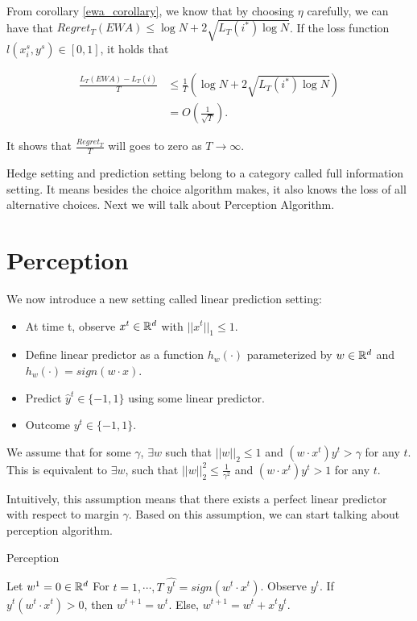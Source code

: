 \documentclass[../main.tex]{subfiles}
\begin{document}
From corollary \ref{ewa_corollary}, we know that by choosing $\eta$ carefully, we can have that $Regret_T(EWA) \leq \log N + 2 \sqrt{L_T(i^*) \log N}$. If the loss function $l(x_i^s, y^s) \in [0,1]$, it holds that

\begin{equation*}
\begin{aligned}
\frac{L_T(EWA) - L_T(i)}{T} & \leq \frac{1}{T} (\log N + 2 \sqrt{L_T(i^*) \log N}) \\
& = O(\frac{1}{\sqrt{T}}).
\end{aligned}
\end{equation*}

It shows that $\frac{Regret_T }{T}$ will goes to zero as $T \to \infty$. 

Hedge setting and prediction setting belong to a category called full information setting. It means besides the choice algorithm makes, it also knows the loss of all alternative choices. Next we will talk about Perception Algorithm.

\section{Perception}

We now introduce a new setting called linear prediction setting:

\begin{itemize}
	\item At time t, observe $x^t \in \mathbb{R}^d$ with $||x^t||_1 \leq 1$.
	\item Define linear predictor as a function $h_w(\cdot)$ parameterized by $w \in \mathbb{R}^d$ and $h_w(\cdot) = sign(w \cdot x)$.
	\item Predict $\hat{y}^t \in \{-1, 1\}$ using some linear predictor.
	\item Outcome $y^t \in \{-1, 1\}$.
\end{itemize}

We assume that for some $\gamma$, $\exists w$ such that $||w||_2 \leq 1$ and $(w\cdot x^t) y^t > \gamma$ for any $t$. This is equivalent to $\exists w$, such that $||w||^2_2 \leq \frac{1}{\gamma^2}$ and $(w\cdot x^t) y^t > 1$ for any $t$.

Intuitively, this assumption means that there exists a perfect linear predictor with respect to margin $\gamma$. Based on this assumption, we can start talking about perception algorithm.

\begin{algorithm}[H]
	\caption{Perception}
	\begin{algorithmic}
		\STATE Let $w^1 = 0 \in \mathbb{R}^d$
		\STATE For $t = 1,\cdots, T$
		\bindent
			\STATE $\hat{y^t} = sign(w^t \cdot x^t)$.
			\STATE Observe $y^t$.
			\STATE If $y^t(w^t\cdot x^t) >0$, then $w^{t+1} = w^t$.
			\STATE Else, $w^{t+1} = w^t + x^ty^t$.
		\eindent
	\end{algorithmic}
\end{algorithm}
\end{document}

